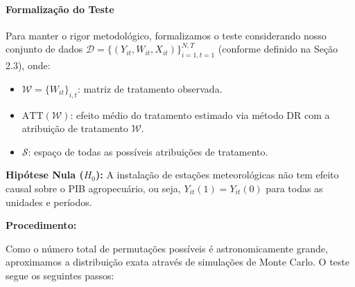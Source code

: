 \documentclass[
	12pt,				%
	oneside,			%
	a4paper,			%
	english,			%
	french,				%
	spanish,			%
	brazil				%
	]{abntex2}
\begin{document}
\paragraph{Formalização do Teste}

Para manter o rigor metodológico, formalizamos o teste considerando nosso conjunto de dados $\mathcal{D} = \{(Y_{it}, W_{it}, X_{it})\}_{i=1,t=1}^{N,T}$ (conforme definido na Seção 2.3), onde:

\begin{itemize}
\item $\mathcal{W} = \{W_{it}\}_{i,t}$: matriz de tratamento observada.
\item $\text{ATT}(\mathcal{W})$: efeito médio do tratamento estimado via método DR com a atribuição de tratamento $\mathcal{W}$.
\item $\mathcal{S}$: espaço de todas as possíveis atribuições de tratamento.
\end{itemize}

\textbf{Hipótese Nula ($H_0$):} A instalação de estações meteorológicas não tem efeito causal sobre o PIB agropecuário, ou seja, $Y_{it}(1) = Y_{it}(0)$ para todas as unidades e períodos.

\textbf{Procedimento:}

Como o número total de permutações possíveis é astronomicamente grande, aproximamos a distribuição exata através de simulações de Monte Carlo. O teste segue os seguintes passos:
\end{document}
